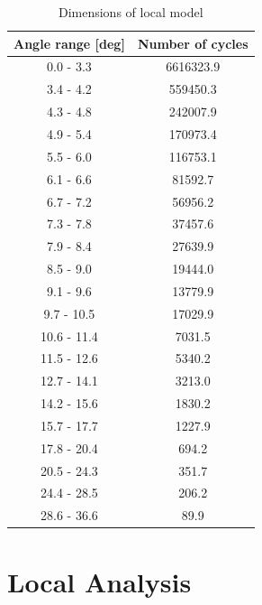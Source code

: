 \begin{table} [H]
\centering
\begin{tabular}{ |c|c|}
\hline
Angle range [deg] & Number of cycles \\
 \hline
 \hline
0.0 - 3.3 & 6616323.9\\

3.4 - 4.2 & 559450.3\\
 
4.3 - 4.8 & 242007.9 \\
 
4.9 - 5.4& 170973.4  \\

5.5 - 6.0& 116753.1  \\

6.1  - 6.6 & 81592.7  \\

6.7 - 7.2 & 56956.2 \\

7.3 - 7.8 & 37457.6 \\

7.9 - 8.4 & 27639.9 \\

8.5 - 9.0 & 19444.0 \\

9.1 - 9.6 & 13779.9 \\

9.7 - 10.5 & 17029.9 \\

10.6 - 11.4 & 7031.5 \\

11.5 - 12.6 & 5340.2 \\

12.7 - 14.1 & 3213.0 \\

14.2 - 15.6 & 1830.2 \\

15.7 - 17.7 & 1227.9 \\

17.8 - 20.4 & 694.2 \\

20.5 - 24.3 & 351.7 \\

24.4 - 28.5 & 206.2 \\

28.6 - 36.6 & 89.9 \\

 \hline
\end{tabular}
\caption{Dimensions of local model}
\label{table:dim}
\end{table} 


\section{Local Analysis}
